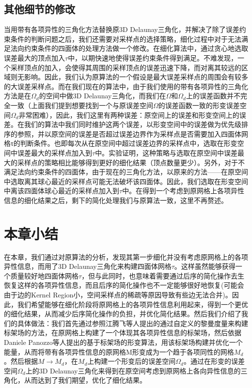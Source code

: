 \subsection{其他细节的修改}
当用带有各项异性的三角化方法替换原3D Delaunay三角化，并解决了除了误差约束条件的判断问题之后，我们还需要对采样点的选择策略，细化过程中对于无法满足法向约束条件的四面体的处理方法做一个修改。在细化算法中，通过贪心地选取误差最大的顶点加入$\tau$中，以期快速地使得误差约束条件得到满足。不难发现，一个采样顶点的加入，会使得其周围的采样顶点的误差迅速下降，而对离其较远的区域则无影响。因此，我们认为原算法的一个假设是最大误差采样点的周围会有较多的大误差采样点。而在我们现在的算法中，由于我们使用的带有各项异性的三角化方法是在$\Omega_d$的空间中做3D Delaunay三角化，而我们在$\Omega$和$\Omega_d$上的误差函数并不完全一致（上面我们提到想要找到一个与原误差空间$\Omega$的误差函数一致的形变误差空间$\Omega_d$非常困难），因此，我们这里有两种误差：原空间上的误差和形变空间上的误差。在我们的算法中我们同时维护这两个误差，以形变空间中的误差做为优先级排序的参照，并以原空间的误差是否超过误差边界作为采样点是否需要加入四面体网格τ的判断条件。也即每次从在原空间中超过误差边界的采样点中，选取在形变空间中误差最大的采样点加入到$\tau$中。实验证明，这种策略与选取在原空间中误差最大的采样点的策略相比能够得到更好的细化结果（顶点数量更少）。另外，对于不满足法向约束条件的四面体，由于现在的三角化方法，以原来的方法——在原空间中选取离其球心最近的采样点可能无法破坏该四面体。因此，我们选取在形变空间中离该四面体球心最近的采样点加入到$\tau$中。在得到一个考虑到原网格上各项异性信息的细化结果之后，剩下的简化处理我们与原算法一致，这里不再赘述。

\section{本章小结}
在本章，我们通过对原算法的分析，发现其第一步细化并没有考虑原网格上的各项异性信息，而用了3D Delaunay三角化来构建四面体网格$\tau$。这样虽然能够获得一个质量较好地四面体网格$\tau$，但与此同时，也意味着需要通过后序的简化操作去生恢复这样的各项异性信息，而且后序的简化操作也不一定能够很好地恢复(可能会由于边的Kernel Region小，空间采样点的稀疏等原因导致有些边无法合并)。因此，我们希望能够在细化阶段将原网格上的各项异性信息利用起来，得到一个更优的细化结果，从而减少后序简化操作的负担，并优化简化结果。然后我们介绍了我们的具体做法：我们首先通过参照江腾飞等人提出的通过自定义的黎曼度量来构建标架场的方法\cite{frame-field-gen}，在原网格上构建了一个体现其各项异性信息的标架场，然后依据Daniele Panozzo等人提出的基于标架场的形变算法\cite{frame-field-warping}，用该标架场构建并优化一个能量，从而将带有各项异性信息的原网格M形变成为一个趋于各项同性的网格$M_d$。然后根据$M \to M_d$，在$M_d$上构建一个形变后的误差空间$\Omega_d$。通过在形变的误差空间$\Omega_d$上的3D Delaunay三角化来得到在原空间考虑到原网格上各向异性信息的三角化，从而达到了我们期望，优化了细化结果。
